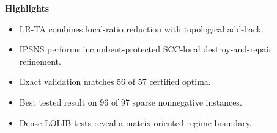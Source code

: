 \documentclass[11pt]{article}
\begin{document}
\begin{center}
\Large\textbf{Highlights}
\end{center}

\vspace{0.5em}

\begin{itemize}
    \item LR-TA combines local-ratio reduction with topological add-back.
    \item IPSNS performs incumbent-protected SCC-local destroy-and-repair refinement.
    \item Exact validation matches 56 of 57 certified optima.
    \item Best tested result on 96 of 97 sparse nonnegative instances.
    \item Dense LOLIB tests reveal a matrix-oriented regime boundary.
\end{itemize}
\end{document}
